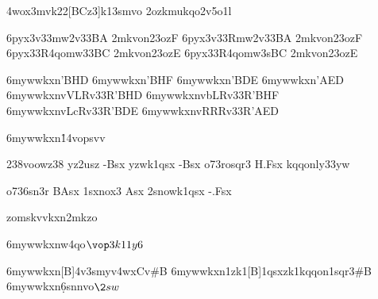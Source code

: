 
\nym4wox3mvk22[BCz3]{k13smvo}   %
\42ozkmukqo{2v5o1l}              %


\xo6pyx3{\2v33}{mw2v33BA 2mkvon\wkq23ozF}   %
\xo6pyx3{\2v33R}{mw2v33BA 2mkvon\wkq23ozF}   %
\xo6pyx3{\33R4qo}{mw33BC 2mkvon\wkq23ozE}    %
\xo6pyx3{\s3R4qo}{mw3sBC 2mkvon\wkq23ozE}    %

\xo6mywwkxn{\VL}{{'BHD}}        %
\xo6mywwkxn{\bL}{{'BHF}}        %
\xo6mywwkxn{\Lc}{{'BDE}}        %
\xo6mywwkxn{\RR}{{'AED}}        %
\xo6mywwkxn{\2vVLR}{{\2v33R'BHD}}    %
\xo6mywwkxn{\2vbLR}{{\2v33R'BHF}}    %
\xo6mywwkxn{\2vLcR}{{\2v33R'BDE}}    %
\xo6mywwkxn{\2vRRR}{{\2v33R'AED}}    %


\xo6mywwkxn{\rvsxopsvv}{\r14vopsvv}


\zkqo238vo{owz38}
\3yz2usz -Bsx
\3yzwk1qsx -Bsx
\3o73rosqr3 H.Fsx
\1kqqonly33yw

\3o736sn3r BAsx
\zk1sxnox3 Asx
\ynn2snowk1qsx  -.Fsx

\2zomskv{vkxn2mkzo}

\xo6mywwkxn{\vk}{{\1w\R4qo$\vop3k11y6$}}

\xo6mywwkxn{\wm}[B]{\w4v3smyv4wx{C}{v}{#B}}
\xo6mywwkxn{\wk1zk1}[B]{\wk1qsxzk1{\1kqqon1sqr3#B}}
\xo6mywwkxn{\d6snnvo}{$\2sw$}



